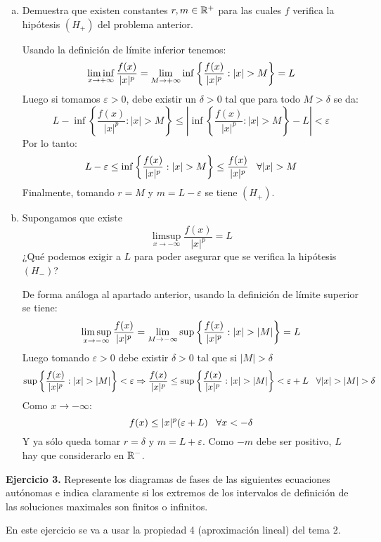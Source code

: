 \documentclass[12pt]{article}
\theoremstyle{definition}
\theoremstyle{remark}
\begin{document}
\begin{enumerate}[(a)]
\item Demuestra que existen constantes $r,m\in\mathbb{R}^+$ para las cuales $f$ verifica la hipótesis $(H_+)$ del problema anterior.

Usando la definición de límite inferior tenemos:
\[
\liminf_{x\to+\infty}\frac{f(x)}{|x|^p}=\limitemasinfinito{M}{\inf\left\{\frac{f(x)}{|x|^p}:|x|>M\right\}}=L
\]
Luego si tomamos $\varepsilon>0$, debe existir un $\delta>0$ tal que para todo $M>\delta$ se da:
\[
L-\inf\left\{\frac{f(x)}{|x|^p}:|x|>M\right\}\leq \left|\inf\left\{\frac{f(x)}{|x|^p}:|x|>M\right\}-L\right|<\varepsilon
\]
Por lo tanto:
\[
L-\varepsilon\leq \inf\left\{\frac{f(x)}{|x|^p}:|x|>M\right\} \leq \frac{f(x)}{|x|^p} \espacio \forall |x|>M
\]
Finalmente, tomando $r=M$ y $m=L-\varepsilon$ se tiene $(H_+)$.

\item Supongamos que existe 
\[
\limsup_{x\to-\infty}\frac{f(x)}{|x|^p}=L
\]
¿Qué podemos exigir a $L$ para poder asegurar que se verifica la hipótesis $(H_-)$?

De forma análoga al apartado anterior, usando la definición de límite superior se tiene:
\[
\limsup_{x\to-\infty}\frac{f(x)}{|x|^p}=\limitemenosinfinito{M}{\sup\left\{\frac{f(x)}{|x|^p}:|x|>|M|\right\}}=L
\]
Luego tomando $\varepsilon>0$ debe existir $\delta>0$ tal que si $|M|>\delta$
\[
\sup\left\{\frac{f(x)}{|x|^p}:|x|>|M|\right\} < \varepsilon \Rightarrow \frac{f(x)}{|x|^p} \leq \sup\left\{\frac{f(x)}{|x|^p}:|x|>|M|\right\} < \varepsilon + L \espacio \forall |x| > |M| > \delta
\]
Como $x\longrightarrow -\infty$:
\[
f(x)\leq |x|^p(\varepsilon+L) \;\;\; \forall x < -\delta
\]
Y ya sólo queda tomar $r=\delta$ y $m=L+\varepsilon$. Como $-m$ debe ser positivo, $L$ hay que considerarlo en $\mathbb{R}^-$.
\end{enumerate}

\textbf{Ejercicio 3.} Represente los diagramas de fases de las siguientes ecuaciones autónomas e indica claramente si los extremos de los intervalos de definición de las soluciones maximales son finitos o infinitos.

En este ejercicio se va a usar la propiedad 4 (aproximación lineal) del tema 2.
\end{document}
